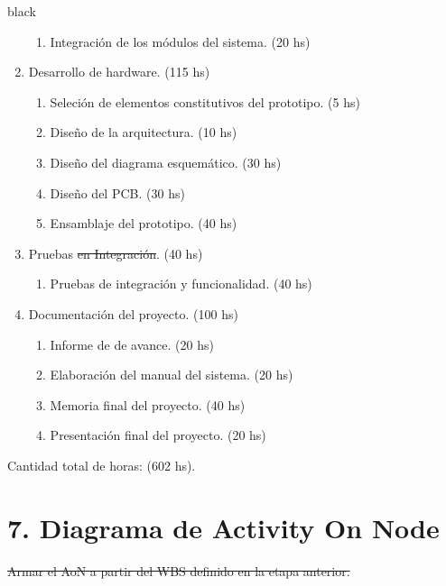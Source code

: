 \documentclass[11pt]{charter}
\providecommand{\DIFadd}[1]{{\protect\color{blue}\uwave{#1}}} %
\providecommand{\DIFdel}[1]{{\protect\color{red}\sout{#1}}}                      %
\providecommand{\DIFaddbegin}{} %
\providecommand{\DIFaddend}{} %
\providecommand{\DIFdelbegin}{} %
\providecommand{\DIFdelend}{} %
\begin{document}
\begin{consigna}{black}
\begin{enumerate}
\begin{enumerate}
		\item Integración de los módulos del sistema. \hfill(20 hs)
	\end{enumerate}
    \item Desarrollo de hardware. \hfill(115 hs)
    \begin{enumerate}
    	\item Seleción de elementos constitutivos del prototipo. \hfill(5 hs)
    	\item Diseño de la arquitectura. \hfill(10 hs)
    	\item Diseño del diagrama esquemático. \hfill(30 hs)
    	\item Diseño del PCB. \hfill(30 hs)
    	\item Ensamblaje del prototipo. \hfill(40 hs)
    \end{enumerate}
	\item Pruebas \DIFdelbegin \DIFdel{en Integración}\DIFdelend \DIFaddbegin \DIFadd{de integración}\DIFaddend . \hfill(40 hs)
	\begin{enumerate}
		\item Pruebas de integración y funcionalidad. \hfill(40 hs)
	\end{enumerate}
	\item Documentación del proyecto. \hfill(100 hs)
	\begin{enumerate}
		\item Informe de de avance. \hfill(20 hs)
		\item Elaboración del manual del sistema. \hfill(20 hs)
		\item Memoria final del proyecto. \hfill(40 hs)
		\item Presentación final del proyecto. \hfill(20 hs)
	\end{enumerate}

\end{enumerate}

Cantidad total de horas: (602 hs).

\end{consigna}

\section{7. Diagrama de Activity On Node}
\label{sec:AoN}

\DIFdelbegin %
\DIFdel{Armar el AoN a partir del WBS definido en la etapa anterior. }%
\end{document}

